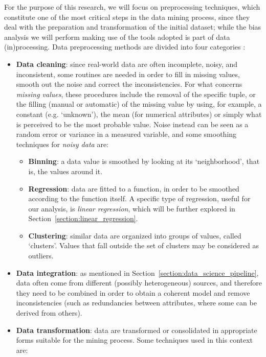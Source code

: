 For the purpose of this research, we will focus on preprocessing techniques, which constitute one of the most critical steps in the data mining process, since they deal with the preparation and transformation of the initial dataset; while the bias analysis we will perform making use of the tools adopted is part of data (in)processing. Data preprocessing methods are divided into four categories \cite{tamilselvi2015efficient}:
\begin{itemize}
\item \textbf{Data cleaning}: since real-world data are often incomplete, noisy, and inconsistent, some routines are needed in order to fill in missing values, smooth out the noise and correct the inconsistencies.
For what concerns \textit{missing values}, these procedures include the removal of the specific tuple, or the filling (manual or automatic) of the missing value by using, for example, a constant (e.g. `unknown'), the mean (for numerical attributes) or simply what is perceived to be the most probable value.
Noise instead can be seen as a random error or variance in a measured variable, and some smoothing techniques for \textit{noisy data} are:
\begin{itemize}
\item \textbf{Binning}: a data value is smoothed by looking at its `neighborhood', that is, the values around it.
\item \textbf{Regression}: data are fitted to a function, in order to be smoothed according to the function itself. A specific type of regression, useful for our analysis, is \textit{linear regression}, which will be further explored in Section~\ref{section:linear_regression}.
\item \textbf{Clustering}: similar data are organized into groups of values, called `clusters'. Values that fall outside the set of clusters may be considered as outliers.
\end{itemize}
\item \textbf{Data integration}: as mentioned in Section~\ref{section:data_science_pipeline}, data often come from different (possibly heterogeneous) sources, and therefore they need to be combined in order to obtain a coherent model and remove inconsistencies (such as redundancies between attributes, where some can be derived from others).
\item \textbf{Data transformation}: data are transformed or consolidated in appropriate forms suitable for the mining process. Some techniques used in this context are:
\begin{itemize}

\end{itemize}
\end{itemize}
